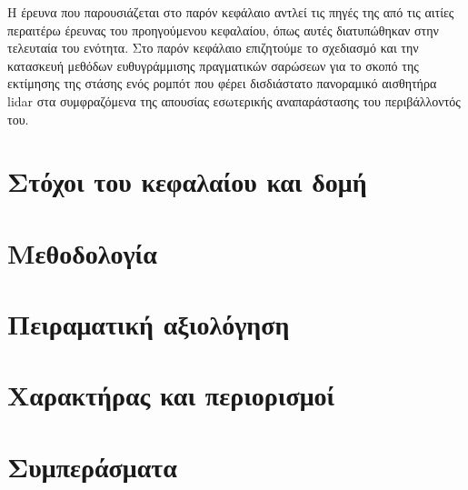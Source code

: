 Η έρευνα που παρουσιάζεται στο παρόν κεφάλαιο αντλεί τις πηγές της από τις
αιτίες περαιτέρω έρευνας του προηγούμενου κεφαλαίου, όπως αυτές διατυπώθηκαν
στην τελευταία του ενότητα. Στο παρόν κεφάλαιο επιζητούμε το σχεδιασμό και την
κατασκευή μεθόδων ευθυγράμμισης πραγματικών σαρώσεων για το σκοπό της εκτίμησης
της στάσης ενός ρομπότ που φέρει δισδιάστατο πανοραμικό αισθητήρα lidar στα
συμφραζόμενα της απουσίας εσωτερικής αναπαράστασης του περιβάλλοντός του.

\section{Στόχοι του κεφαλαίου και δομή}
  \label{section:02_05_01}
  

\section{Μεθοδολογία}
  \label{section:02_05_02}
  

\section{Πειραματική αξιολόγηση}
  \label{section:02_05_03}
  

\section{Χαρακτήρας και περιορισμοί}
  \label{section:02_05_04}
  

\section{Συμπεράσματα}
  \label{section:02_05_05}
  

